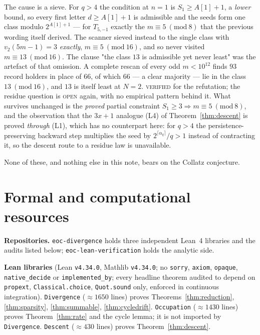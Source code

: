 \documentclass[11pt,reqno]{amsart}
\theoremstyle{plain}
\theoremstyle{definition}
\newcommand{\lab}[1]{\textnormal{\textsc{\small #1}}}
\begin{document}
\begin{enumerate}
The cause is a sieve. For $q>4$ the condition at $n=1$ is $S_1\ge A[1]+1$, a
\emph{lower} bound, so every first letter $d\ge A[1]+1$ is admissible and the
seeds form one class modulo $2^{A[1]+1}$ --- for $T_{5,-1}$ exactly the
$m\equiv5\ (\mathrm{mod}\ 8)$ that the previous wording itself derived. The
scanner sieved instead to the single class with $v_2(5m-1)=3$ \emph{exactly},
$m\equiv5\ (\mathrm{mod}\ 16)$, and so never visited $m\equiv13\
(\mathrm{mod}\ 16)$. The clause "the class $13$ is admissible yet never least"
was the artefact of that omission. A complete rescan of every odd $m<10^{12}$
finds $93$ record holders in place of $66$, of which $66$ --- a clear majority ---
lie in the class $13\ (\mathrm{mod}\ 16)$, and $13$ is itself least at $N=2$.
\lab{verified} for the refutation; the residue question is \lab{open} again, with
no empirical pattern behind it. What survives unchanged is the \emph{proved}
partial constraint $S_1\ge3\Rightarrow m\equiv5\ (\mathrm{mod}\ 8)$, and the
observation that the $3x+1$ analogue (L4) of Theorem~\ref{thm:descent} is proved
\emph{through} (L1), which has no counterpart here: for $q>4$ the
persistence-preserving backward step multiplies the seed by
$2^{\lceil\alpha_q\rceil}/q>1$ instead of contracting it, so the descent route to
a residue law is unavailable.
\end{enumerate}

\noindent None of these, and nothing else in this note, bears on the Collatz
conjecture.

\section{Formal and computational resources}\label{sec:resources}

\noindent\textbf{Repositories.} \texttt{eoc-divergence} \cite{EOCDivergenceRepo}
holds three independent Lean~4 libraries and the audits listed below;
\texttt{eoc-lean-verification} \cite{EOCLeanRepo} holds the analytic side.

\medskip
\noindent\textbf{Lean libraries} (Lean \texttt{v4.34.0}, Mathlib
\texttt{v4.34.0}; no \texttt{sorry}, \texttt{axiom}, \texttt{opaque},
\texttt{native\_decide} or \texttt{implemented\_by}; every headline theorem
audited to depend on \texttt{propext}, \texttt{Classical.choice},
\texttt{Quot.sound} only, enforced in continuous integration).
\texttt{Divergence} ($\approx1650$ lines) proves Theorems~\ref{thm:reduction},
\ref{thm:sparsity}, \ref{thm:summable}, \ref{thm:cycledrift}.
\texttt{Occupation} ($\approx1430$ lines) proves Theorem~\ref{thm:rate} and the
cycle lemma; it is not imported by \texttt{Divergence}.
\texttt{Descent} ($\approx430$ lines) proves Theorem~\ref{thm:descent}.
\end{document}
